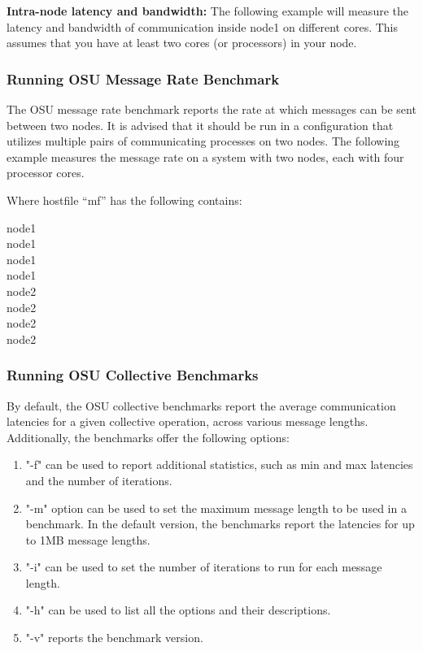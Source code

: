 

\noindent\textbf{Intra-node latency and bandwidth:} The following
example will measure the latency and bandwidth of communication inside
node1 on different cores. This assumes that you have at least two cores
(or processors) in your node.



\subsubsection{Running OSU Message Rate Benchmark}

\noindent The OSU message rate benchmark reports the rate at which
messages can be sent between two nodes. It is advised that it should be
run in a configuration that utilizes multiple pairs of communicating
processes on two nodes. The following example measures the message rate
on a system with two nodes, each with four processor cores.


\noindent Where hostfile ``mf'' has the following contains:

\noindent node1\\
node1\\
node1\\
node1\\
node2\\
node2\\
node2\\
node2\\

\subsubsection{Running OSU Collective Benchmarks}
\noindent By default, the OSU collective benchmarks report the average
communication latencies for a given collective operation, across various message lengths. 
Additionally, the benchmarks offer the following options:
\begin{enumerate}
    \item "-f" can be used to report additional statistics,
           such as min and max latencies and the number of iterations.
    \item "-m" option can be used to set the maximum message length to be used in a
           benchmark. In the default version, the benchmarks report the
           latencies for up to 1MB message lengths.
    \item "-i" can be used to set the number of iterations to run for each message
           length.
    \item "-h" can be used to list all the options and their descriptions. 
    \item "-v" reports the benchmark version. 
\end{enumerate}


